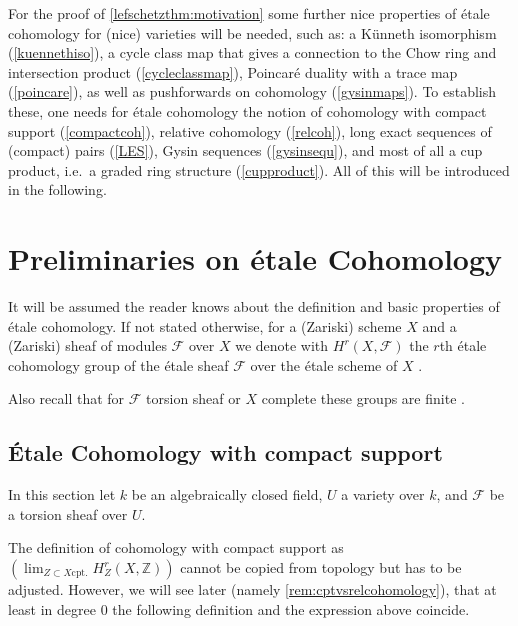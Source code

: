\documentclass[english]{scrartcl}
\theoremstyle{definition}
\theoremstyle{remark}
\newcommand*{\Z}{\mathds{Z}}
\newcommand*{\F}{\mathcal{F}} %
\newcommand*{\idest}{i.e.\ }
\newcommand*{\forexample}{e.g.\ }
\begin{document}
For the proof of \ref{lefschetzthm:motivation}
some further nice properties of étale cohomology for
(nice) varieties will be needed, such as:
a Künneth isomorphism (\autoref{kuennethiso}),
a cycle class map that gives a connection to the Chow ring and
intersection product (\autoref{cycleclassmap}),
Poincaré duality with a trace map (\autoref{poincare}),
as well as pushforwards on cohomology (\autoref{gysinmaps}).
To establish these, one needs for étale cohomology the notion of
cohomology with compact support (\autoref{compactcoh}),
relative cohomology (\autoref{relcoh}),
long exact sequences of (compact) pairs (\autoref{LES}),
Gysin sequences (\autoref{gysinsequ}),
and most of all a cup product, \idest a graded ring structure
(\autoref{cupproduct}).
All of this will be introduced in the following.

\section{Preliminaries on étale Cohomology}
It will be assumed the reader knows about the definition and basic
properties of étale cohomology. If not stated otherwise, for a
(Zariski) scheme $X$ and a (Zariski) sheaf of modules $\F$ over $X$ we
denote with $H^r(X,\F)$ the $r$th étale cohomology group of the étale
sheaf $\F$ over the étale scheme of $X$
\cite[compare][Chap.~6, Examples of Sheaves on $X_\text{ét}$]{milne}.

Also recall that for $\F$ torsion sheaf or $X$ complete these groups
are finite \cite[\forexample][Thm.~19.1]{milne}.

\subsection{Étale Cohomology with compact support}
In this section let $k$ be an algebraically closed field,
$U$ a variety over $k$,
and $\F$ be a torsion sheaf over $U$.

The definition of cohomology with compact support as
$\left(\lim_{Z\subset X \text{cpt.}}H_Z^r(X,\Z)\right)$
cannot be copied from topology but has to be adjusted.
However, we will see later (namely \autoref{rem:cptvsrelcohomology}),
that at least in degree 0 the following definition
and the expression above coincide.
\end{document}
